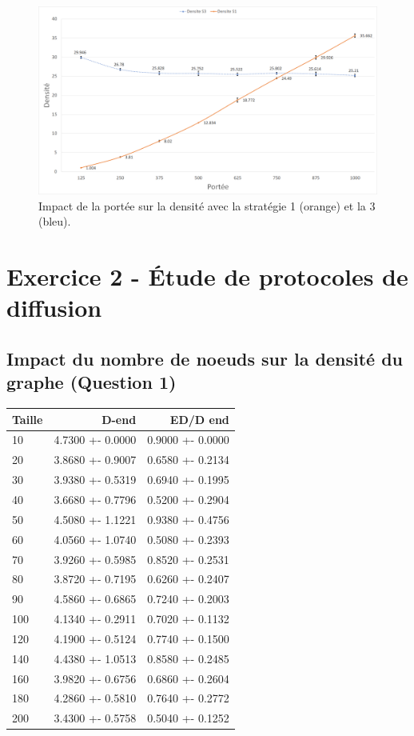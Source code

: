 \documentclass[a4paper]{article}
\begin{document}
\begin{figure}[H]
  \centering
  \includegraphics[width=\textwidth]{images/q10-11-s1and2.png}
  \caption{Impact de la portée sur la densité avec la stratégie 1 (orange) et la 3 (bleu).}
  \label{fig:S1-S3-portee}
\end{figure}


\section{Exercice 2 - Étude de protocoles de diffusion}
\subsection{Impact du nombre de noeuds sur la densité du
  graphe (Question 1)}
\begin{table}[H]
  \centering
  \begin{tabular}{|l|r|r|}
    \hline
    Taille & D-end & ED/D end \\ \hline
    10 & 4.7300 +- 0.0000 & 0.9000 +- 0.0000 \\ \hline
    20 & 3.8680 +- 0.9007 & 0.6580 +- 0.2134 \\ \hline
    30 & 3.9380 +- 0.5319 & 0.6940 +- 0.1995 \\ \hline
    40 & 3.6680 +- 0.7796 & 0.5200 +- 0.2904 \\ \hline
    50 & 4.5080 +- 1.1221 & 0.9380 +- 0.4756 \\ \hline
    60 & 4.0560 +- 1.0740 & 0.5080 +- 0.2393 \\ \hline
    70 & 3.9260 +- 0.5985 & 0.8520 +- 0.2531 \\ \hline
    80 & 3.8720 +- 0.7195 & 0.6260 +- 0.2407 \\ \hline
    90 & 4.5860 +- 0.6865 & 0.7240 +- 0.2003 \\ \hline
    100 & 4.1340 +- 0.2911 & 0.7020 +- 0.1132 \\ \hline
    120 & 4.1900 +- 0.5124 & 0.7740 +- 0.1500 \\ \hline
    140 & 4.4380 +- 1.0513 & 0.8580 +- 0.2485 \\ \hline
    160 & 3.9820 +- 0.6756 & 0.6860 +- 0.2604 \\ \hline
    180 & 4.2860 +- 0.5810 & 0.7640 +- 0.2772 \\ \hline
    200 & 3.4300 +- 0.5758 & 0.5040 +- 0.1252 \\ \hline
  \end{tabular}
\end{table}
\end{document}
